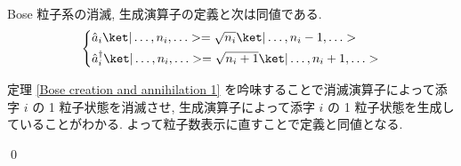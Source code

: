 \documentclass[uplatex,dvipdfmx,a4paper,11pt]{jlreq}
\makeatletter
\numberwithin{equation}{section}
\theoremstyle{definition}
\renewenvironment{proof}[1][\proofname]{\par
  \normalfont
  \topsep6\p@\@plus6\p@ \trivlist
  \item[\hskip\labelsep{\bfseries #1}\@addpunct{\bfseries}]\ignorespaces\quad\par
}{
  \qed\endtrivlist\@endpefalse
}
\renewcommand\proofname{証明}
\makeatother
\begin{document}
\begin{theorem}[Q21-35, Q21-36]
  Bose 粒子系の消滅, 生成演算子の定義と次は同値である.
  \begin{align}
    \begin{dcases}
      \hat{a}_i\ket|\ldots,n_i,\ldots> = \sqrt{n_i}\ket|\ldots,n_i-1,\ldots> \\
      \hat{a}_i^\dagger\ket|\ldots,n_i,\ldots> = \sqrt{n_i+1}\ket|\ldots,n_i+1,\ldots>
    \end{dcases}
  \end{align}
  \label{Bose creation and annihilation 2}
\end{theorem}
\begin{proof}
  定理 \ref{Bose creation and annihilation 1} を吟味することで消滅演算子によって添字 $i$ の 1 粒子状態を消滅させ, 生成演算子によって添字 $i$ の 1 粒子状態を生成していることがわかる. よって粒子数表示に直すことで定義と同値となる.
\end{proof}
\end{document}

